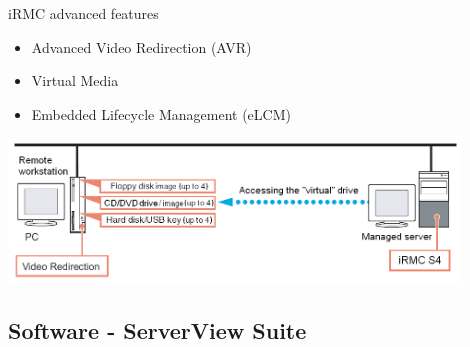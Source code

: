 \documentclass{beamer}
\begin{document}
  \begin{frame}{iRMC advanced features}
	  \begin{itemize}
		  \item Advanced Video Redirection (AVR)
		  \item Virtual Media
		  \item Embedded Lifecycle Management (eLCM)
	  \end{itemize}
	  \begin{center}
		  \includegraphics[width=0.9\textwidth]{diagrams/irmc-advanced-features.png}
	  \end{center}
  \end{frame}

  \subsection{Software - ServerView Suite}
\end{document}
